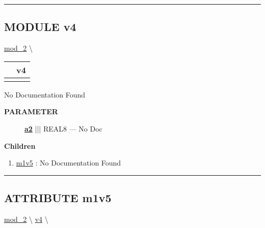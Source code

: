 \rule{\linewidth}{0.5pt}
\subsection*{\textsf{\colorbox{headtoc}{\color{white} MODULE}
v4}}

\hypertarget{ecldoc:mod_2.v4}{}
\hspace{0pt} \hyperlink{ecldoc:mod_2}{mod_2} \textbackslash 

{\renewcommand{\arraystretch}{1.5}
\begin{tabularx}{\textwidth}{|>{\raggedright\arraybackslash}l|X|}
\hline
\hspace{0pt}\mytexttt{\color{red} } & \textbf{v4} \\
\hline
\multicolumn{2}{|>{\raggedright\arraybackslash}X|}{\hspace{0pt}\mytexttt{\color{param} (REAL8 a2)}} \\
\hline
\end{tabularx}
}

\par





No Documentation Found






\par
\begin{description}
\item [\colorbox{tagtype}{\color{white} \textbf{\textsf{PARAMETER}}}] \textbf{\underline{a2}} ||| REAL8 --- No Doc
\end{description}






\textbf{Children}
\begin{enumerate}
\item \hyperlink{ecldoc:mod_1.m1v4.m1v5}{m1v5}
: No Documentation Found
\end{enumerate}

\rule{\linewidth}{0.5pt}

\subsection*{\textsf{\colorbox{headtoc}{\color{white} ATTRIBUTE}
m1v5}}

\hypertarget{ecldoc:mod_1.m1v4.m1v5}{}
\hspace{0pt} \hyperlink{ecldoc:mod_2}{mod_2} \textbackslash 
\hspace{0pt} \hyperlink{ecldoc:mod_2.v4}{v4} \textbackslash 

